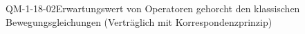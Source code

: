 
\begin{CONC}{QM-1-18-02}{Erwartungswert von Operatoren gehorcht den klassischen Bewegungsgleichungen (Verträglich mit Korrespondenzprinzip)}
\end{CONC}
